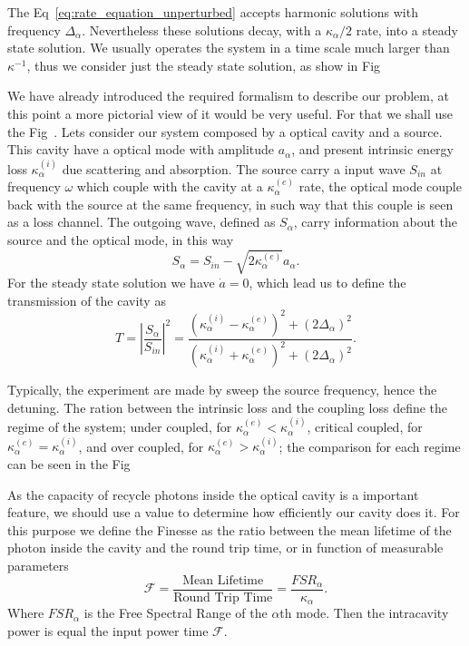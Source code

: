 The Eq~\ref{eq:rate_equation_unperturbed} accepts harmonic solutions with frequency $\Delta_\alpha$. Nevertheless these solutions decay, with a  $\kappa_\alpha/2$ rate, into a steady state solution. We usually operates the system in a time scale much larger than $\kappa^{-1}$, thus we consider just the steady state solution, as show in Fig~

We have already introduced the required formalism to describe our problem, at this point a more pictorial view of it would be very useful. For that we shall use the Fig~. Lets consider our system composed by a optical cavity and a source. This cavity have a optical mode with amplitude $a_\alpha$, and present intrinsic energy loss $\kappa_\alpha^{(i)}$ due scattering and absorption. The source carry a input wave $S_{in}$ at frequency $\omega$ which couple with the cavity at a $\kappa_\alpha^{(e)}$ rate, the optical mode couple back with the source at the same frequency, in such way that this couple is seen as a loss channel. The outgoing wave, defined as $S_\alpha$, carry information about the source and the optical mode, in this way
\begin{equation}
    S_\alpha = S_{in} - \sqrt{2 \kappa_\alpha^{(e)}}a_\alpha.
\end{equation}
For the steady state solution we have $\dot{a} = 0$, which lead us to define the transmission of the cavity as
\begin{equation}
    T = \left|\frac{S_\alpha}{S_{in}}\right|^2 = \frac{\left(\kappa_\alpha^{(i)} -\kappa_\alpha^{(e)}\right)^2 + (2\Delta_\alpha)^2}{\left(\kappa_\alpha^{(i)} +\kappa_\alpha^{(e)}\right)^2 + (2\Delta_\alpha)^2}.
    \label{eq:single_mode_transmission}
\end{equation}

Typically, the experiment are made by sweep the source frequency, hence the detuning. The ration between the intrinsic loss and the coupling loss define the regime of the system; under coupled, for $\kappa_\alpha^{(e)} < \kappa_\alpha^{(i)}$, critical coupled, for $\kappa_\alpha^{(e)} = \kappa_\alpha^{(i)}$, and over coupled, for $\kappa_\alpha^{(e)} > \kappa_\alpha^{(i)}$; the comparison for each regime can be seen in the Fig~ 

As the capacity of recycle photons inside the optical cavity is a important feature, we should use a value to determine how efficiently our cavity does it. For this purpose we define the Finesse as the ratio between the mean lifetime of the photon inside the cavity and the round trip time, or in function of measurable parameters 
\begin{equation}
    \mathcal{F} = \frac{\text{Mean Lifetime}}{\text{Round Trip Time}} = \frac{FSR_\alpha}{\kappa_\alpha}.
    \label{eq:finesse}
\end{equation}
Where $FSR_\alpha$ is the Free Spectral Range of the $\alpha$th mode. Then the intracavity power is equal the input power time $\mathcal{F}$.

